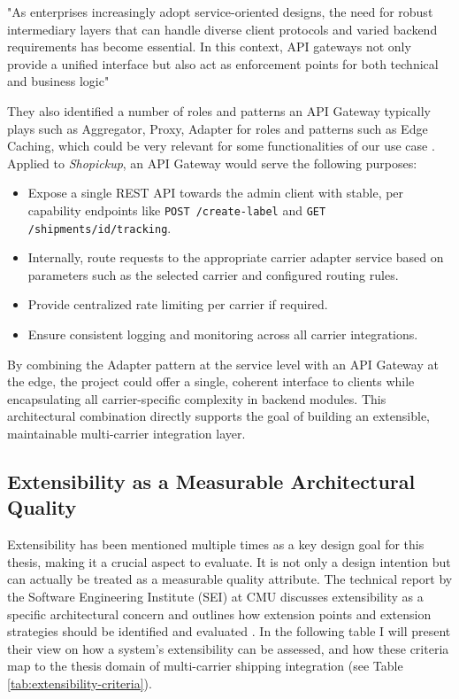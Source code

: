 \documentclass{imc-inf}
\begin{document}
\begin{displayquote}{}
  "As enterprises increasingly adopt service-oriented designs, the need for robust intermediary layers that can handle diverse client protocols and varied backend requirements has become essential.
  In this context, API gateways not only provide a unified interface but also act as enforcement points for both technical and business logic" \parencite{ochubaSystematicReviewAPI2021}
\end{displayquote}

They also identified a number of roles and patterns an API Gateway typically plays such as Aggregator, Proxy, Adapter for roles and patterns such as Edge Caching, which could be very relevant for some functionalities of our use case \cite{ochubaSystematicReviewAPI2021}.
Applied to \textit{Shopickup}, an API Gateway would serve the following purposes:

\begin{itemize}[itemsep=3pt]
  \item Expose a single REST API towards the admin client with stable, per capability endpoints like \texttt{POST /create-label} and \texttt{GET /shipments/{id}/tracking}.
  \item Internally, route requests to the appropriate carrier adapter service based on parameters such as the selected carrier and configured routing rules.
  \item Provide centralized rate limiting per carrier if required.
  \item Ensure consistent logging and monitoring across all carrier integrations.
\end{itemize}

By combining the Adapter pattern at the service level with an API Gateway at the edge, the project could offer a single, coherent interface to clients while encapsulating all carrier-specific complexity in backend modules.
This architectural combination directly supports the goal of building an extensible, maintainable multi-carrier integration layer.

\subsection{Extensibility as a Measurable Architectural Quality}

Extensibility has been mentioned multiple times as a key design goal for this thesis, making it a crucial aspect to evaluate. It is not only a design intention but can actually be treated as a measurable quality attribute.
The technical report by the Software Engineering Institute (SEI) at CMU discusses extensibility as a specific architectural concern and outlines how extension points and extension strategies should be identified and evaluated \cite{kazmanExtensibility2022}.
In the following table I will present their view on how a system's extensibility can be assessed, and how these criteria map to the thesis domain of multi-carrier shipping integration (see Table \ref{tab:extensibility-criteria}).
\end{document}
